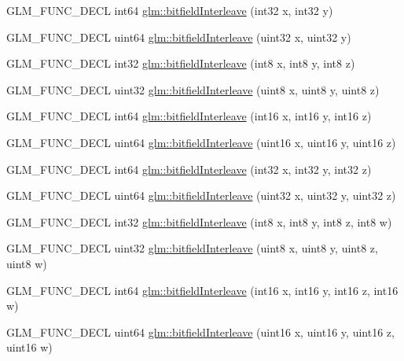 \begin{DoxyCompactItemize}
\item 
G\+L\+M\+\_\+\+F\+U\+N\+C\+\_\+\+D\+E\+CL int64 \hyperlink{group__gtx__bit_ga0de51d5985e6a703f305a5a61479babd}{glm\+::bitfield\+Interleave} (int32 x, int32 y)
\item 
G\+L\+M\+\_\+\+F\+U\+N\+C\+\_\+\+D\+E\+CL uint64 \hyperlink{group__gtx__bit_ga2bc87fd66f6f8471c1a46888360cef12}{glm\+::bitfield\+Interleave} (uint32 x, uint32 y)
\item 
G\+L\+M\+\_\+\+F\+U\+N\+C\+\_\+\+D\+E\+CL int32 \hyperlink{group__gtx__bit_ga6dee2ce1c45805063bb7fc5f6fd8f5ca}{glm\+::bitfield\+Interleave} (int8 x, int8 y, int8 z)
\item 
G\+L\+M\+\_\+\+F\+U\+N\+C\+\_\+\+D\+E\+CL uint32 \hyperlink{group__gtx__bit_gab9d593a2e916beb8f8137a0dbeae3afe}{glm\+::bitfield\+Interleave} (uint8 x, uint8 y, uint8 z)
\item 
G\+L\+M\+\_\+\+F\+U\+N\+C\+\_\+\+D\+E\+CL int64 \hyperlink{group__gtx__bit_gaf898f842ac089fcc8d6201c32702584a}{glm\+::bitfield\+Interleave} (int16 x, int16 y, int16 z)
\item 
G\+L\+M\+\_\+\+F\+U\+N\+C\+\_\+\+D\+E\+CL uint64 \hyperlink{group__gtx__bit_ga3c170e2ec54f2faab5e1c5bb693d718d}{glm\+::bitfield\+Interleave} (uint16 x, uint16 y, uint16 z)
\item 
G\+L\+M\+\_\+\+F\+U\+N\+C\+\_\+\+D\+E\+CL int64 \hyperlink{group__gtx__bit_ga64e2d84f6560af3cc639644b1e628c42}{glm\+::bitfield\+Interleave} (int32 x, int32 y, int32 z)
\item 
G\+L\+M\+\_\+\+F\+U\+N\+C\+\_\+\+D\+E\+CL uint64 \hyperlink{group__gtx__bit_ga7c10eb37f608365cfaef5ca2c476e1ce}{glm\+::bitfield\+Interleave} (uint32 x, uint32 y, uint32 z)
\item 
G\+L\+M\+\_\+\+F\+U\+N\+C\+\_\+\+D\+E\+CL int32 \hyperlink{group__gtx__bit_ga7da84ecc2b3a46c9c08a9f40012359cf}{glm\+::bitfield\+Interleave} (int8 x, int8 y, int8 z, int8 w)
\item 
G\+L\+M\+\_\+\+F\+U\+N\+C\+\_\+\+D\+E\+CL uint32 \hyperlink{group__gtx__bit_ga447c0bbed9d60c14578626d8f03f3755}{glm\+::bitfield\+Interleave} (uint8 x, uint8 y, uint8 z, uint8 w)
\item 
G\+L\+M\+\_\+\+F\+U\+N\+C\+\_\+\+D\+E\+CL int64 \hyperlink{group__gtx__bit_ga09ee0be0fac790a1607a711e597dd9bf}{glm\+::bitfield\+Interleave} (int16 x, int16 y, int16 z, int16 w)
\item 
G\+L\+M\+\_\+\+F\+U\+N\+C\+\_\+\+D\+E\+CL uint64 \hyperlink{group__gtx__bit_gac8a926a7bfd9b23c22a4f685193fbfe1}{glm\+::bitfield\+Interleave} (uint16 x, uint16 y, uint16 z, uint16 w)
\end{DoxyCompactItemize}


